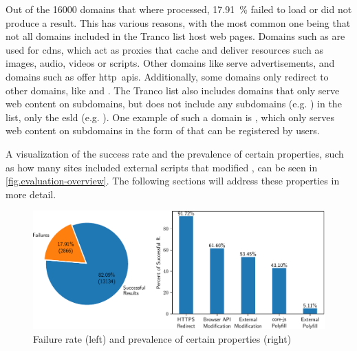 Out of the \num[round-precision=0]{16000} domains that where processed, \SI[round-precision=0]{17.91}{\percent} failed to load or did not produce a result. This has various reasons, with the most common one being that not all domains included in the Tranco list host web pages. Domains such as  are used for \acp{cdn}, which act as proxies that cache and deliver resources such as images, audio, videos or scripts. Other domains like  serve advertisements, and domains such as  offer \acs{http}~\acsp{api}. Additionally, some domains only redirect to other domains, like  and . The Tranco list also includes domains that only serve web content on subdomains, but does not include any subdomains (e.g. ) in the list, only the \ac{esld} (e.g. ). One example of such a domain is , which only serves web content on subdomains in the form of  that can be registered by users.

A visualization of the success rate and the prevalence of certain properties, such as how many sites included external scripts that modified \browserAPIs{}, can be seen in \autoref{fig.evaluation-overview}. The following sections will address these properties in more detail.

\begin{figure}[H]
    \centering
    \includegraphics[width=16cm]{img/evaluation-overview.pdf}
    \caption{Failure rate (left) and prevalence of certain properties (right)}
    \label{fig.evaluation-overview}
\end{figure}

